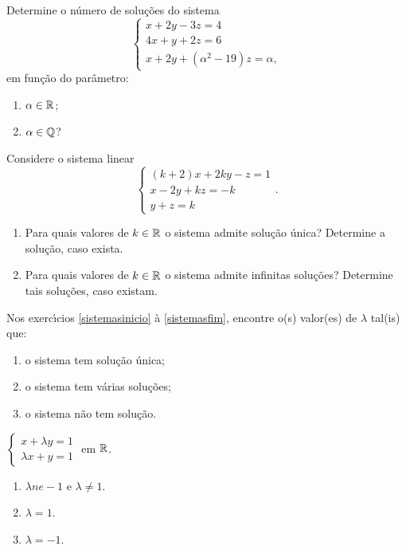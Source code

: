 \documentclass[12pt]{exam}
\begin{document}
\begin{exercicio}
  Determine o n\'umero de solu\c{c}\~oes do sistema
  \[
    \begin{cases}
      x + 2y - 3z = 4\\
      4x + y + 2z = 6\\
      x + 2y + (\alpha^2 - 19)z = \alpha,  
    \end{cases}
\]
em fun\c{c}\~ao do par\^ametro:
\begin{enumerate}[label={\alph*})]
   \item $\alpha \in \mathbb{R}$;
   \item $\alpha \in \mathbb{Q}$?
 \end{enumerate} 
\end{exercicio}

\begin{exercicio}
  Considere o sistema linear
  \[
    \begin{cases}
      (k + 2)x + 2ky - z = 1\\
      x - 2y + kz = -k\\
      y + z = k
    \end{cases}.
  \]
  \begin{enumerate}[label={\alph*})]
    \item Para quais valores de $k \in \mathbb{R}$ o sistema admite solu\c{c}\~ao \'unica? Determine a solu\c{c}\~ao, caso exista.
    \item Para quais valores de $k \in \mathbb{R}$ o sistema admite infinitas solu\c{c}\~oes? Determine tais solu\c{c}\~oes, caso existam.
  \end{enumerate}
\end{exercicio}

Nos exerc{\'\i}cios \ref{sistemasinicio} \`a \ref{sistemasfim}, encontre o(s) valor(es) de $\lambda$ tal(is) que:
\begin{enumerate}[label={\alph*})]
  \item o sistema tem solu\c{c}\~ao \'unica;
  \item o sistema tem v\'arias solu\c{c}\~oes;
  \item o sistema n\~ao tem solu\c{c}\~ao.
\end{enumerate}

\begin{exercicio}\label{sistemasinicio}
  $
    \begin{cases}
      x + \lambda y = 1\\
      \lambda x + y = 1
    \end{cases}
  $
  em $\mathbb{R}$.
  \begin{solucao}
    \begin{enumerate}[label={\alph*})]
      \item $\lambda ne -1$ e $\lambda \ne 1$.
      \item $\lambda = 1$.
      \item $\lambda = -1$.
    \end{enumerate}
  \end{solucao}
\end{exercicio}
\end{document}
